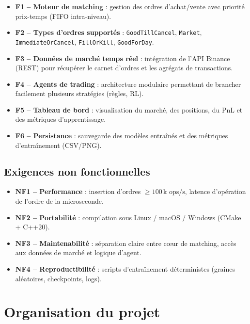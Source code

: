 \documentclass[11pt,a4paper]{article}
\begin{document}
\begin{itemize}[leftmargin=1.2cm]
    \item \textbf{F1 -- Moteur de matching} : gestion des ordres
          d'achat/vente avec priorité prix-temps (FIFO intra-niveau).
    \item \textbf{F2 -- Types d'ordres supportés} :
          \texttt{GoodTillCancel}, \texttt{Market},
          \texttt{ImmediateOrCancel}, \texttt{FillOrKill},
          \texttt{GoodForDay}.
    \item \textbf{F3 -- Données de marché temps réel} :
          intégration de l'API Binance (REST) pour récupérer
          le carnet d'ordres et les agrégats de transactions.
    \item \textbf{F4 -- Agents de trading} : architecture
          modulaire permettant de brancher facilement plusieurs
          stratégies (règles, RL).
    \item \textbf{F5 -- Tableau de bord} : visualisation du
          marché, des positions, du PnL et des métriques
          d'apprentissage.
    \item \textbf{F6 -- Persistance} : sauvegarde des modèles
          entraînés et des métriques d'entraînement (CSV/PNG).
\end{itemize}

\subsection{Exigences non fonctionnelles}

\begin{itemize}[leftmargin=1.2cm]
    \item \textbf{NF1 -- Performance} : insertion d'ordres
          $\geq 100\,\text{k ops/s}$, latence d'opération
          de l'ordre de la microseconde.
    \item \textbf{NF2 -- Portabilité} : compilation sous
          Linux / macOS / Windows (CMake + C++20).
    \item \textbf{NF3 -- Maintenabilité} : séparation
          claire entre cœur de matching, accès aux données
          de marché et logique d'agent.
    \item \textbf{NF4 -- Reproductibilité} : scripts
          d'entraînement déterministes (graines aléatoires,
          checkpoints, logs).
\end{itemize}


\section{Organisation du projet}
\label{sec:orga}
\end{document}
